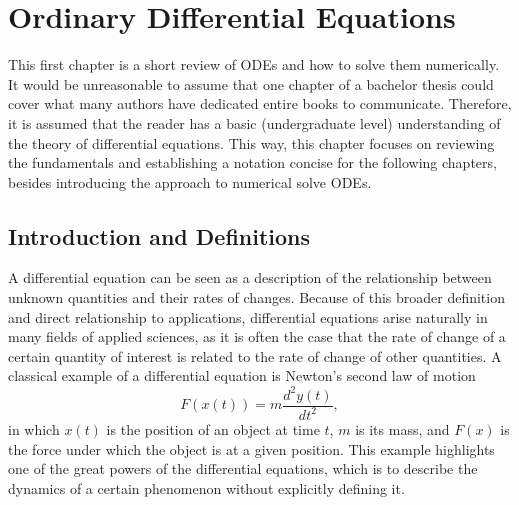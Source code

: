 \chapter{Ordinary Differential Equations}

This first chapter is a short review of \gls{ODE}s and how to solve them numerically.
It would be unreasonable to assume that one chapter of a bachelor thesis could cover what many authors have dedicated entire books to communicate.
Therefore, it is assumed that the reader has a basic (undergraduate level) understanding of the theory of differential equations\footnotemark.
This way, this chapter focuses on reviewing the fundamentals and establishing a notation concise for the following chapters, besides introducing the approach to numerical solve \gls{ODE}s.

\section{Introduction and Definitions}

A differential equation can be seen as a description of the relationship between unknown quantities and their rates of changes.
Because of this broader definition and direct relationship to applications, differential equations arise naturally in many fields of applied sciences\cite{hairer_solving_1993}, as it is often the case that the rate of change of a certain quantity of interest is related to the rate of change of other quantities.
A classical example of a differential equation is Newton's second law of motion \[
F\left( x\left( t \right) \right) = m \frac{d^2 y(t)}{d t^2}
,\] in which $x\left( t \right) $ is the position of an object at time $t$, $m$ is its mass, and $F(x)$ is the force under which the object is at a given position.
This example highlights one of the great powers of the differential equations, which is to describe the dynamics of a certain phenomenon without explicitly defining it.


